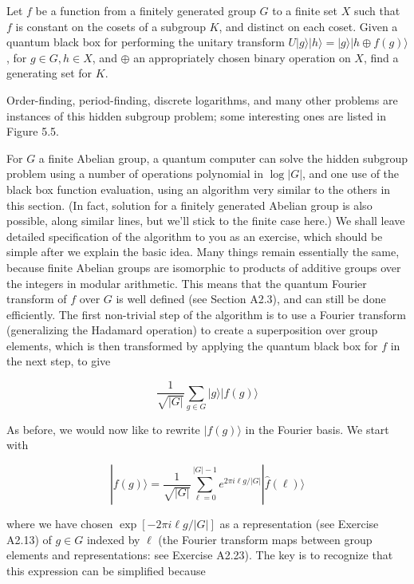 Let $f$ be a function from a finitely generated group $G$ to a finite set $X$ such that $f$ is constant on the cosets of a subgroup $K$, and distinct on each coset. Given a quantum black box for performing the unitary transform $U|g\rangle|h\rangle=|g\rangle|h \oplus f(g)\rangle$, for $g \in G, h \in X$, and $\oplus$ an appropriately chosen binary operation on $X$, find a generating set for $K$.

Order-finding, period-finding, discrete logarithms, and many other problems are instances of this hidden subgroup problem; some interesting ones are listed in Figure 5.5.

For $G$ a finite Abelian group, a quantum computer can solve the hidden subgroup problem using a number of operations polynomial in $\log |G|$, and one use of the black box function evaluation, using an algorithm very similar to the others in this section. (In fact, solution for a finitely generated Abelian group is also possible, along similar lines, but we'll stick to the finite case here.) We shall leave detailed specification of the algorithm to you as an exercise, which should be simple after we explain the basic idea. Many things remain essentially the same, because finite Abelian groups are isomorphic to products of additive groups over the integers in modular arithmetic. This means that the quantum Fourier transform of $f$ over $G$ is well defined (see Section A2.3), and can still be done efficiently. The first non-trivial step of the algorithm is to use a Fourier transform (generalizing the Hadamard operation) to create a superposition over group elements, which is then transformed by applying the quantum black box for $f$ in the next step, to give

\begin{equation}
    \frac{1}{\sqrt{|G|}} \sum_{g \in G}|g\rangle|f(g)\rangle \tag{5.74}
\end{equation}

As before, we would now like to rewrite $|f(g)\rangle$ in the Fourier basis. We start with

\begin{equation}
    |f(g)\rangle=\frac{1}{\sqrt{|G|}} \sum_{\ell=0}^{|G|-1} e^{2 \pi i \ell g /|G|}|\hat{f}(\ell)\rangle \tag{5.75}
\end{equation}

where we have chosen $\exp [-2 \pi i \ell g /|G|]$ as a representation (see Exercise A2.13) of $g \in G$ indexed by $\ell$ (the Fourier transform maps between group elements and representations: see Exercise A2.23). The key is to recognize that this expression can be simplified because

